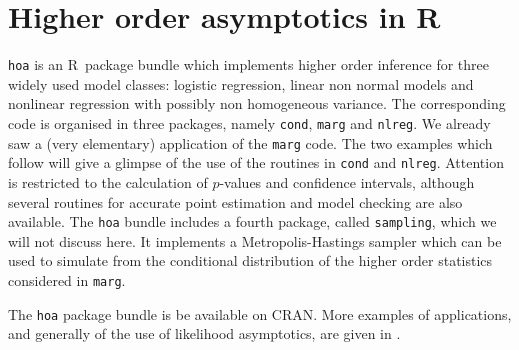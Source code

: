\documentclass[a4paper,11pt]{article}
\def\R{{\sf R}}
\def\code{\texttt}
\begin{document}
\section*{Higher order asymptotics in \R}
%
\code{hoa} is an \R\ package bundle which implements higher order inference for three widely used model classes: logistic regression, linear non normal models and nonlinear regression with possibly non homogeneous variance.  The corresponding code is organised in three packages, namely \code{cond}, \code{marg} and \code{nlreg}.  We already saw a (very elementary) application of the \code{marg} code.  The two examples which follow will give a glimpse of the use of the routines in \code{cond} and \code{nlreg}.  Attention is restricted to the calculation of $p$-values and confidence intervals, although several routines for accurate point estimation and model checking are also available.  The \code{hoa} bundle includes a fourth package, called \code{sampling}, which we will not discuss here.  It implements a Metropolis-Hastings sampler which can be used to simulate from the conditional distribution of the higher order statistics considered in \code{marg}.  

The \code{hoa} package bundle is be available on CRAN.  More examples of applications, and generally of the use of likelihood asymptotics, are given in \citet{brazzale.davison.reid:2006}.
\end{document}
